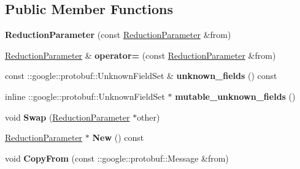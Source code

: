 \subsection*{Public Member Functions}
\begin{DoxyCompactItemize}
\item 
\mbox{\label{classcaffe_1_1_reduction_parameter_a1038be0f65c73f5675edf97779c86504}} 
{\bfseries Reduction\+Parameter} (const \mbox{\hyperlink{classcaffe_1_1_reduction_parameter}{Reduction\+Parameter}} \&from)
\item 
\mbox{\label{classcaffe_1_1_reduction_parameter_af614a27d62a0cbea5a5805378ccba081}} 
\mbox{\hyperlink{classcaffe_1_1_reduction_parameter}{Reduction\+Parameter}} \& {\bfseries operator=} (const \mbox{\hyperlink{classcaffe_1_1_reduction_parameter}{Reduction\+Parameter}} \&from)
\item 
\mbox{\label{classcaffe_1_1_reduction_parameter_ae1d04473b65b70d3ffc7b831c015ee2e}} 
const \+::google\+::protobuf\+::\+Unknown\+Field\+Set \& {\bfseries unknown\+\_\+fields} () const
\item 
\mbox{\label{classcaffe_1_1_reduction_parameter_a3d0e04400959dfadcc018d9271dca15e}} 
inline \+::google\+::protobuf\+::\+Unknown\+Field\+Set $\ast$ {\bfseries mutable\+\_\+unknown\+\_\+fields} ()
\item 
\mbox{\label{classcaffe_1_1_reduction_parameter_aa7f57fa9194f25a16f4feab76f9224ac}} 
void {\bfseries Swap} (\mbox{\hyperlink{classcaffe_1_1_reduction_parameter}{Reduction\+Parameter}} $\ast$other)
\item 
\mbox{\label{classcaffe_1_1_reduction_parameter_a0135dd0a5c7c30d155123662db56c16e}} 
\mbox{\hyperlink{classcaffe_1_1_reduction_parameter}{Reduction\+Parameter}} $\ast$ {\bfseries New} () const
\item 
\mbox{\label{classcaffe_1_1_reduction_parameter_ae54600eb913d4d37a194d8531723f0c1}} 
void {\bfseries Copy\+From} (const \+::google\+::protobuf\+::\+Message \&from)
\item 

\end{DoxyCompactItemize}
